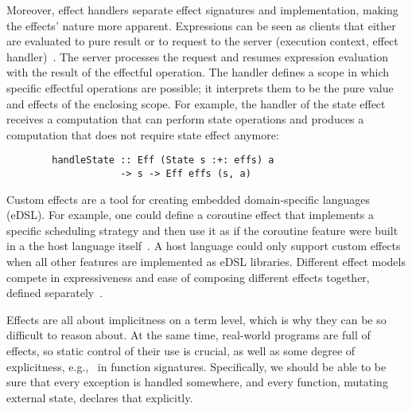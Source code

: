 \documentclass[conference]{IEEEtran}
\begin{document}
    Moreover, effect handlers separate effect signatures and implementation, making the effects' nature more apparent.
    Expressions can be seen as clients that either are evaluated to pure result or to request to the server (execution context, effect handler)~\cite{kiselyov2013extensible}.
    The server processes the request and resumes expression evaluation with the result of the effectful operation.
    The handler defines a scope in which specific effectful operations are possible; it interprets them to be the pure value and effects of the enclosing scope.
    For example, the handler of the state effect receives a computation that can perform state operations and produces a computation that does not require state effect anymore:
    \begin{verbatim}
        handleState :: Eff (State s :+: effs) a
                    -> s -> Eff effs (s, a)
    \end{verbatim}

    Custom effects are a tool for creating embedded domain-specific languages (eDSL).
    For example, one could define a coroutine effect that implements a specific scheduling strategy and then use it as if the coroutine feature were built in a the host language itself~\cite{leijen2017structured}.
    A host language could only support custom effects when all other features are implemented as eDSL libraries.
    Different effect models compete in expressiveness and ease of composing different effects together, defined separately~\cite{liang1995monad, kiselyov2013extensible, schrijvers2019monad, van2024framework}.

    Effects are all about implicitness on a term level, which is why they can be so difficult to reason about.
    At the same time, real-world programs are full of effects, so static control of their use is crucial, as well as some degree of explicitness, e.g., \ in function signatures.
    Specifically, we should be able to be sure that every exception is handled somewhere, and every function, mutating external state, declares that explicitly.
\end{document}

